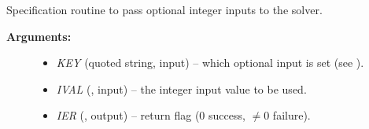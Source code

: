 \documentclass[letterpaper,10pt,english]{sphinxmanual}
\begin{document}
\begin{fulllineitems}
\label{f_interface/Usage:f/_/FARKSETIIN}
Specification routine to pass optional integer inputs
to the {\hyperref[f_interface/Usage:f/_/FARKODE]{\emph{}}} solver.
\begin{description}
\item[{\textbf{Arguments:}}] \leavevmode\begin{itemize}
\item {} 
\emph{KEY} (quoted string, input) -- which optional input
is set (see {\hyperref[f_interface/Usage:finterface-iinoptiontable]{\emph{}}}).

\item {} 
\emph{IVAL} (, input) -- the integer input value to be used.

\item {} 
\emph{IER} (, output) -- return flag (0 success, \(\ne 0\) failure).

\end{itemize}

\end{description}

\end{fulllineitems}
\end{document}
